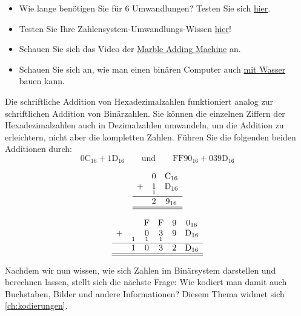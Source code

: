\begin{mychallenge}\label{challenge:online}
	\begin{itemize}
		\item Wie lange benötigen Sie für 6 Umwandlungen? Testen Sie sich \href{https://oinf.ch/interactive/umrechnen-zwischen-zahlensystemen/}{hier}.
		\item Testen Sie Ihre Zahlensystem-Umwandlungs-Wissen \href{https://oinf.ch/interactive/basiswechsel-10-zu-2/}{hier}!
		\item Schauen Sie sich das Video der \href{https://www.youtube.com/watch?app=desktop&v=GcDshWmhF4A&embeds_referring_euri=https%3A%2F%2Fwww.yaplakal.com%2Fforum28%2Fst%2F125%2Ftopic930979.html&feature=emb_imp_woyt}{Marble Adding Machine} an.
		\item Schauen Sie sich an, wie man einen binären Computer auch \href{https://youtu.be/5wKz1e0ULcg?si=AiPXUniyfU15X11m}{mit Wasser} bauen kann.
	\end{itemize}
\end{mychallenge}

\begin{mychallenge}
	\label{challenge:hexAddition}
	Die schriftliche Addition von Hexadezimalzahlen funktioniert analog zur schriftlichen Addition von Binärzahlen. Sie können die einzelnen Ziffern der Hexadezimalzahlen auch in Dezimalzahlen umwandeln, um die Addition zu erleichtern, nicht aber die kompletten Zahlen. Führen Sie die folgenden beiden Additionen durch:
	$$ 0\text{C}_{16} + 1\text{D}_{16} \qquad \text{und} \qquad \text{FF}90_{16} + 039\text{D}_{16}$$
	\begin{myanswer}
		\[
			\begin{array}{ccc}
				  & 0               & \text{C}_{16}              \\
				+ & \underset{1}{1} & \underset{}{\text{D}_{16}} \\
				\hline
				  & 2               & 9_{16}                     \\
				\hline\hline
			\end{array}
		\]

		\[
			\begin{array}{cccccc}
				  &                & \text{F}        & \text{F}        & 9              & 0_{16}                     \\
				+ & \underset{1}{} & \underset{1}{0} & \underset{1}{3} & \underset{}{9} & \underset{}{\text{D}_{16}} \\
				\hline
				  & 1              & 0               & 3               & 2              & \text{D}_{16}              \\
				\hline\hline
			\end{array}
		\]
	\end{myanswer}
\end{mychallenge}

Nachdem wir nun wissen, wie sich Zahlen im Binärsystem darstellen und berechnen lassen, stellt sich die nächste Frage: Wie kodiert man damit auch Buchstaben, Bilder und andere Informationen? Diesem Thema widmet sich \cref{ch:kodierungen}.
